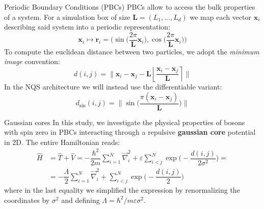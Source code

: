 \documentclass{beamer}
\begin{document}

\begin{frame}{Periodic Boundary Conditions (PBCs)}
PBCs allow to access the bulk properties of a system. For a simulation box of size 
$\bm{L} = (L_1,...,L_d)$ we map each vector $\bm{x}_i$ describing said system into a periodic representation:
\begin{equation*}
  \bm{x}_i \longmapsto \bm{r}_i=\Biggr(\sin\biggr(\dfrac{2\pi}{\bm{L}}\bm{x}_i\biggr), \cos\biggr(\dfrac{2\pi}{\bm{L}}\bm{x}_i\biggr)\Biggr)
\end{equation*}
To compute the euclidean distance between two particles, we adopt the \textit{minimum image} convention:
\begin{equation*}
  d(i,j) = \biggr\lVert \bm{x}_i -\bm{x}_j - \bm{L}\left\lfloor \dfrac{\bm{x}_i -\bm{x}_j}{\bm{L}}\right\rceil \biggr\rVert
\end{equation*}
In the NQS architecture we will instead use the differentiable variant:
\begin{equation*}
  d_{\sin}(i,j) = \biggr\lVert \sin\biggr(\dfrac{\pi(\bm{x}_i-\bm{x}_j)}{\bm{L}}\biggr)\biggr\rVert
\end{equation*}

\end{frame}


\begin{frame}{Gaussian cores}
In this study, we investigate the physical properties of bosons with spin zero in PBCs interacting through a 
repulsive \textbf{gaussian core} potential in 2D. The entire Hamiltonian reads:
\begin{equation*}
  \begin{split}
  \hat{H} &= \hat{T}+\hat{V}=-\dfrac{\hbar^2}{2m}\sum_{i=1}^N\vec{\nabla}^2_i+\varepsilon\sum_{i<j}^N\exp\biggr(-\dfrac{d(i,j)}{2\sigma^2}\biggr) = \\ 
      &= -\dfrac{\Lambda}{2}\sum_{i=1}^N\vec{\nabla}^2_i+\sum_{i<j}^N\exp\biggr(-\dfrac{d(i,j)}{2}\biggr)
\end{split}
\end{equation*} 
where in the last equality we simplified the expression by renormalizing the coordinates by $\sigma^2$ and defining $\Lambda=\hbar^2/m\varepsilon\sigma^2$.

\end{frame}

\end{document}
